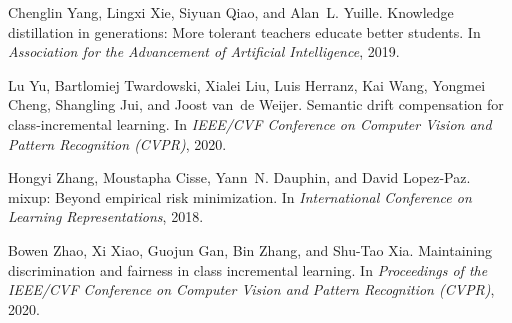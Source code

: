 \documentclass[final]{cvpr}
\begin{document}
\begin{thebibliography}{10}
Chenglin Yang, Lingxi Xie, Siyuan Qiao, and Alan~L. Yuille.
\newblock Knowledge distillation in generations: More tolerant teachers educate
  better students.
\newblock In {\em Association for the Advancement of Artificial Intelligence},
  2019.

Lu Yu, Bartlomiej Twardowski, Xialei Liu, Luis Herranz, Kai Wang, Yongmei
  Cheng, Shangling Jui, and Joost van~de Weijer.
\newblock Semantic drift compensation for class-incremental learning.
\newblock In {\em IEEE/CVF Conference on Computer Vision and Pattern
  Recognition (CVPR)}, 2020.

Hongyi Zhang, Moustapha Cisse, Yann~N. Dauphin, and David Lopez-Paz.
\newblock mixup: Beyond empirical risk minimization.
\newblock In {\em International Conference on Learning Representations}, 2018.

Bowen Zhao, Xi Xiao, Guojun Gan, Bin Zhang, and Shu-Tao Xia.
\newblock Maintaining discrimination and fairness in class incremental
  learning.
\newblock In {\em Proceedings of the IEEE/CVF Conference on Computer Vision and
  Pattern Recognition (CVPR)}, 2020.

\end{thebibliography}
 
\clearpage
\end{document}
